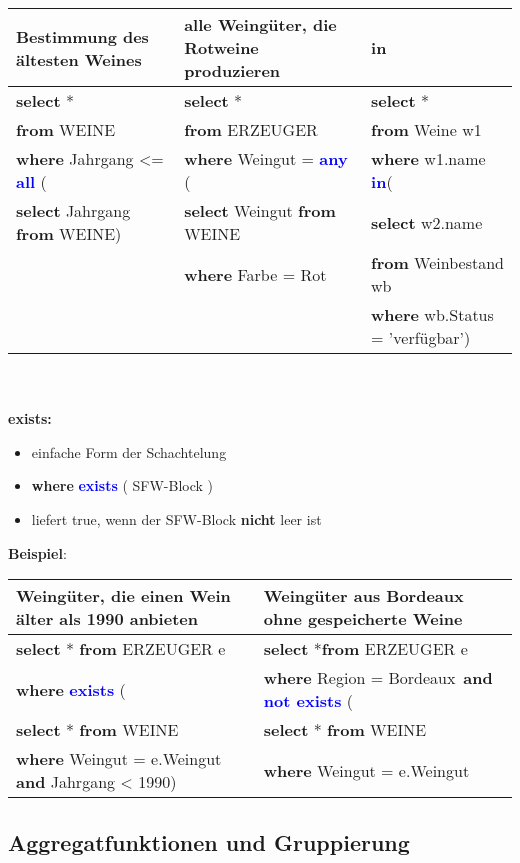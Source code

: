 \documentclass{scrartcl}
\newcommand{\key}[1]{{\textcolor{blue}{\textbf{#1}}}}
\newcommand{\select}{\textbf{select }}
\newcommand{\from}{\textbf{from }}
\newcommand{\where}{\textbf{where }}
\begin{document}
{\renewcommand{\arraystretch}{1.2}
\begin{tabular}{|lp{}l|}
	\hline
	Bestimmung des ältesten Weines & alle Weingüter, die Rotweine produzieren & \textbf{in}\\
	\hline
	\select * &\select * & \select * \\ 
	\from WEINE & \from ERZEUGER & \from Weine w1\\
	\where Jahrgang <= \key{all} ( & \where Weingut = \key{any} ( & \where w1.name \key{in}(\\
	\select Jahrgang \from WEINE) & \select Weingut \from WEINE & \select w2.name \\
	& \where Farbe = \glq Rot\grq& \from Weinbestand wb \\
	&& \where wb.Status = 'verfügbar') \\
	\hline
\end{tabular}
}
\\
\\
\textbf{exists:}
\begin{itemize}
	\itemsep0em
	\item einfache Form der Schachtelung
	\item \where \key{exists} ( SFW-Block )
	\item liefert true, wenn der SFW-Block \textbf{nicht} leer ist
\end{itemize}

\textbf{Beispiel}: \\

{\renewcommand{\arraystretch}{1.2}
	\begin{tabular}{|ll|}
		\hline
		Weingüter, die einen Wein älter als 1990 anbieten & Weingüter aus Bordeaux ohne gespeicherte Weine \\
		\hline
		\select * \from ERZEUGER e&\select *\from ERZEUGER e\\
		\where \key{exists} ( & \where Region = \glq Bordeaux\grq\ \textbf{and} \key{not exists}  ( \\
		\select * \from WEINE & \select * \from WEINE \\
		\where Weingut = e.Weingut \textbf{and} Jahrgang < 1990)& \where Weingut = e.Weingut \\
		\hline
	\end{tabular}
}

\subsection{Aggregatfunktionen und Gruppierung}
\end{document}
